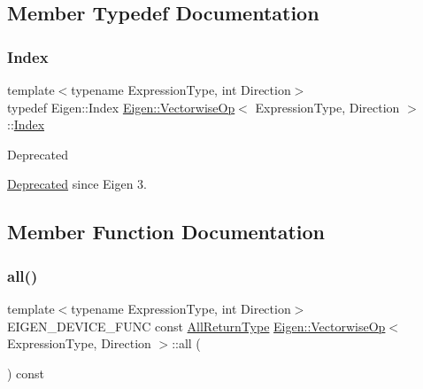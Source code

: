 \subsection{Member Typedef Documentation}
\mbox{\label{class_eigen_1_1_vectorwise_op_a4907c654e5810edd98e4162093b19532}} 
\subsubsection{\texorpdfstring{Index}{Index}}
{\footnotesize\ttfamily template$<$typename Expression\+Type, int Direction$>$ \\
typedef Eigen\+::\+Index \mbox{\hyperlink{class_eigen_1_1_vectorwise_op}{Eigen\+::\+Vectorwise\+Op}}$<$ Expression\+Type, Direction $>$\+::\mbox{\hyperlink{class_eigen_1_1_vectorwise_op_a4907c654e5810edd98e4162093b19532}{Index}}}

\begin{DoxyRefDesc}{Deprecated}
\item[\mbox{\hyperlink{deprecated__deprecated000015}{Deprecated}}]since Eigen 3. \end{DoxyRefDesc}


\subsection{Member Function Documentation}
\mbox{\label{class_eigen_1_1_vectorwise_op_a2762ceabf1fecc22506ed304d0099f6c}} 
\subsubsection{\texorpdfstring{all()}{all()}}
{\footnotesize\ttfamily template$<$typename Expression\+Type, int Direction$>$ \\
E\+I\+G\+E\+N\+\_\+\+D\+E\+V\+I\+C\+E\+\_\+\+F\+U\+NC const \mbox{\hyperlink{class_eigen_1_1_partial_redux_expr}{All\+Return\+Type}} \mbox{\hyperlink{class_eigen_1_1_vectorwise_op}{Eigen\+::\+Vectorwise\+Op}}$<$ Expression\+Type, Direction $>$\+::all (\begin{DoxyParamCaption}{ }\end{DoxyParamCaption}) const\hspace{0.3cm}{\ttfamily [inline]}}

